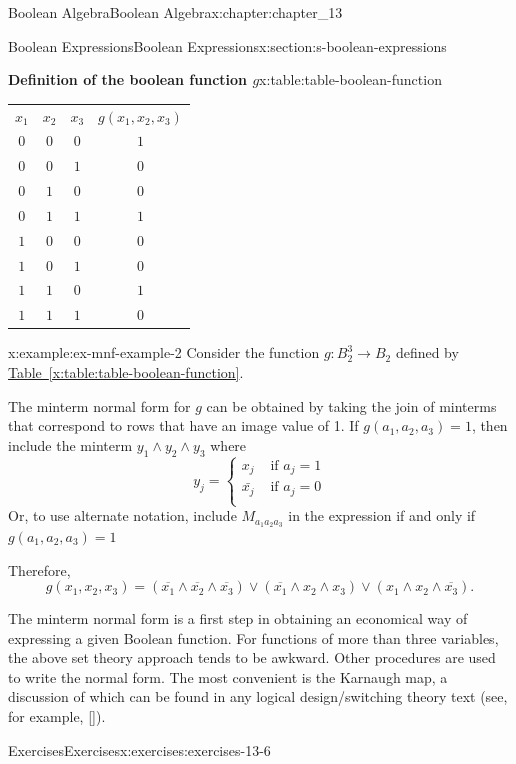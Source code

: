 \documentclass[oneside,10pt,]{book}
\newcommand{\xreffont}{\relax}
\numberwithin{equation}{section}
\begin{document}
\begin{chapterptx}{Boolean Algebra}{}{Boolean Algebra}{}{}{x:chapter:chapter_13}
\begin{sectionptx}{Boolean Expressions}{}{Boolean Expressions}{}{}{x:section:s-boolean-expressions}
\begin{tableptx}{\textbf{Definition of the boolean function \(g\)}}{x:table:table-boolean-function}{}
{\begin{tabular}{cccc}
\(x_1\)&\(x_2\)&\(x_3\)&\(g\left(x_1, x_2, x_3\right)\)\tabularnewline[0pt]
\(0\)&\(0\)&\(0\)&\(1\)\tabularnewline[0pt]
\(0\)&\(0\)&\(1\)&\(0\)\tabularnewline[0pt]
\(0\)&\(1\)&\(0\)&\(0\)\tabularnewline[0pt]
\(0\)&\(1\)&\(1\)&\(1\)\tabularnewline[0pt]
\(1\)&\(0\)&\(0\)&\(0\)\tabularnewline[0pt]
\(1\)&\(0\)&\(1\)&\(0\)\tabularnewline[0pt]
\(1\)&\(1\)&\(0\)&\(1\)\tabularnewline[0pt]
\(1\)&\(1\)&\(1\)&\(0\)
\end{tabular}
}%
\end{tableptx}%
\begin{example}{}{x:example:ex-mnf-example-2}%
Consider the function \(g:B_2^3 \to B_2\) defined by \hyperref[x:table:table-boolean-function]{Table~{\xreffont\ref{x:table:table-boolean-function}}}.%
\par
The minterm normal form for \(g\) can be obtained by taking the join of minterms that correspond to rows that have an image value of 1. If \(g\left(a_1, a_2, a_3\right)=1\), then include the minterm \(y_1\land y_2\land y_3\) where%
\begin{equation*}
y_j=\begin{cases}
x_j & \textrm{ if } a_j=1 \\
\bar{x_j} & \textrm{ if } a_j=0\\
\end{cases}
\end{equation*}
Or, to use alternate notation, include \(M_{a_1a_2a_3}\) in the expression if and only if \(g\left(a_1, a_2, a_3\right)=1\)%
\par
Therefore,%
\begin{equation*}
g\left(x_1, x_2, x_3\right)=\left(\overline{x_1}\land \overline{x_2}\land \overline{x_3}\right)\lor \left(\overline{x_1}\land x_2\land
x_3\right)\lor \left(x_1\land x_2\land \overline{x_3}\right).
\end{equation*}
%
\end{example}
The minterm normal form is a first step in obtaining an economical way of expressing a given Boolean function. For functions of more than three variables, the above set theory approach tends to be awkward. Other procedures are used to write the normal form. The most convenient is the Karnaugh map, a discussion of which can be found in any logical design\slash{}switching theory text (see, for example, \hyperlink{x:biblio:biblio-hill-1974}{[{\xreffont 18}]}).%
%
%
\typeout{************************************************}
\typeout{************************************************}
%
\begin{exercises-subsection}{Exercises}{}{Exercises}{}{}{x:exercises:exercises-13-6}

\end{exercises-subsection}
\end{sectionptx}
\end{chapterptx}
\end{document}
